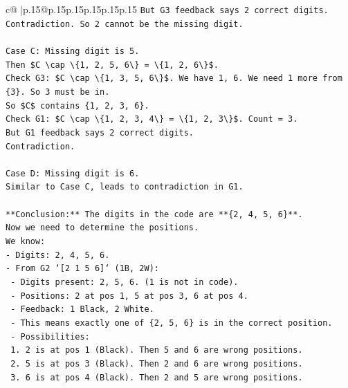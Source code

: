 \documentclass{article}
\begin{document}
{\begin{supertabular}{c@{$\;$}|p{.15\linewidth}@{}p{.15\linewidth}p{.15\linewidth}p{.15\linewidth}p{.15\linewidth}p{.15\linewidth}}
{{{\texttt{But G3 feedback says 2 correct digits.} \\
\texttt{Contradiction. So 2 cannot be the missing digit.} \\
\\ 
\texttt{Case C: Missing digit is 5.} \\
\texttt{Then \$C \textbackslash{}cap \textbackslash{}\{1, 2, 5, 6\textbackslash{}\} = \textbackslash{}\{1, 2, 6\textbackslash{}\}\$.} \\
\texttt{Check G3: \$C \textbackslash{}cap \textbackslash{}\{1, 3, 5, 6\textbackslash{}\}\$. We have 1, 6. We need 1 more from \{3\}. So 3 must be in.} \\
\texttt{So \$C\$ contains \{1, 2, 3, 6\}.} \\
\texttt{Check G1: \$C \textbackslash{}cap \textbackslash{}\{1, 2, 3, 4\textbackslash{}\} = \textbackslash{}\{1, 2, 3\textbackslash{}\}\$. Count = 3.} \\
\texttt{But G1 feedback says 2 correct digits.} \\
\texttt{Contradiction.} \\
\\ 
\texttt{Case D: Missing digit is 6.} \\
\texttt{Similar to Case C, leads to contradiction in G1.} \\
\\ 
\texttt{**Conclusion:** The digits in the code are **\{2, 4, 5, 6\}**.} \\
\texttt{Now we need to determine the positions.} \\
\texttt{We know:} \\
\texttt{{-} Digits: 2, 4, 5, 6.} \\
\texttt{{-} From G2 `{[}2 1 5 6{]}` (1B, 2W):} \\
\texttt{    {-} Digits present: 2, 5, 6. (1 is not in code).} \\
\texttt{    {-} Positions: 2 at pos 1, 5 at pos 3, 6 at pos 4.} \\
\texttt{    {-} Feedback: 1 Black, 2 White.} \\
\texttt{    {-} This means exactly one of \{2, 5, 6\} is in the correct position.} \\
\texttt{    {-} Possibilities:} \\
\texttt{        1. 2 is at pos 1 (Black). Then 5 and 6 are wrong positions.} \\
\texttt{        2. 5 is at pos 3 (Black). Then 2 and 6 are wrong positions.} \\
\texttt{        3. 6 is at pos 4 (Black). Then 2 and 5 are wrong positions.} \\
}}}
\end{supertabular}}
\end{document}
